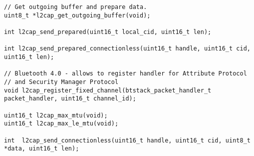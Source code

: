 \begin{lstlisting}
// Get outgoing buffer and prepare data.
uint8_t *l2cap_get_outgoing_buffer(void);

int l2cap_send_prepared(uint16_t local_cid, uint16_t len);

int l2cap_send_prepared_connectionless(uint16_t handle, uint16_t cid, uint16_t len);

// Bluetooth 4.0 - allows to register handler for Attribute Protocol 
// and Security Manager Protocol
void l2cap_register_fixed_channel(btstack_packet_handler_t packet_handler, uint16_t channel_id);

uint16_t l2cap_max_mtu(void);
uint16_t l2cap_max_le_mtu(void);

int  l2cap_send_connectionless(uint16_t handle, uint16_t cid, uint8_t *data, uint16_t len);
\end{lstlisting}
\pagebreak
